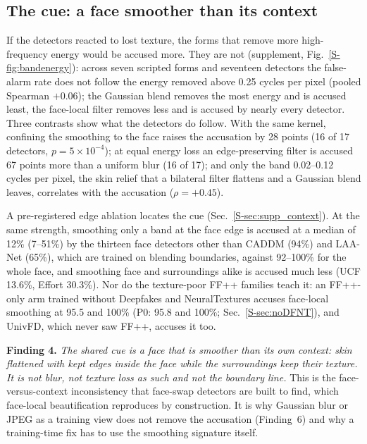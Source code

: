 \documentclass[conference]{IEEEtran}
\begin{document}
\subsection{The cue: a face smoother than its context}
\label{sec:signature}

If the detectors reacted to lost texture, the forms that remove more high-frequency energy would be accused more. They are
not (supplement, Fig.~\ref{S-fig:bandenergy}): across seven scripted forms and seventeen detectors the false-alarm rate does not follow the
energy removed above 0.25 cycles per pixel (pooled Spearman $+0.06$);
the Gaussian blend removes the most energy and is accused least, the face-local filter removes less and is accused by
nearly every detector. Three contrasts show what the detectors do follow. With the same kernel, confining the smoothing to
the face raises the accusation by 28 points (16 of 17 detectors, $p=5\times10^{-4}$); at equal energy loss an
edge-preserving filter is accused 67 points more than a uniform blur (16 of 17); and only the band 0.02--0.12 cycles per
pixel, the skin relief that a bilateral filter flattens and a Gaussian blend leaves, correlates with the accusation
($\rho=+0.45$).

A pre-registered edge ablation locates the cue (Sec.~\ref{S-sec:supp_context}). At the same strength, smoothing only a band
at the face edge is accused at a median of 12\% (7--51\%) by the thirteen face detectors other than CADDM (94\%) and LAA-Net
(65\%), which are trained on blending boundaries, against 92--100\% for the whole face, and smoothing face and surroundings
alike is accused much less (UCF 13.6\%, Effort 30.3\%).
Nor do the texture-poor FF++ families teach it: an FF++-only arm trained without Deepfakes and NeuralTextures accuses
face-local smoothing at 95.5 and 100\% (P0: 95.8 and 100\%; Sec.~\ref{S-sec:noDFNT}), and UnivFD, which never saw FF++, accuses
it too.

\textbf{Finding 4.} \emph{The shared cue is a face that is smoother than its own context: skin flattened with kept edges
inside the face while the surroundings keep their texture. It is not blur, not texture loss as such and not the boundary
line.} This is the face-versus-context inconsistency that face-swap detectors are built to find, which face-local
beautification reproduces by construction. It is why Gaussian blur or JPEG as a training view does not remove the
accusation (Finding~6) and why a training-time fix has to use the smoothing signature itself.
\end{document}
